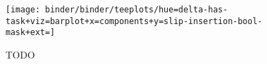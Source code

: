 \begin{figure}
    \centering
    \texttt{[image: binder/binder/teeplots/hue=delta-has-task+viz=barplot+x=components+y=slip-insertion-bool-mask+ext=]}
    \caption{TODO} \label{fig:gain-mechanism}
\end{figure}

